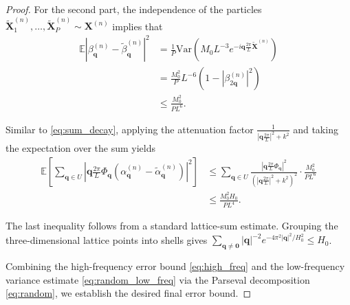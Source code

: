 \documentclass[review,onefignum,onetabnum]{siamart250211}
\begin{document}
\begin{proof}
For the second part, the independence of the particles \( \widetilde{\mathbf{X}}_1^{(n)}, \ldots, \widetilde{\mathbf{X}}_P^{(n)} \sim \mathbf{X}^{(n)} \) implies that 
\begin{equation}
\begin{aligned}
\mathbb{E}\left| \beta^{(n)}_{\mathbf{q}} - \tilde{\beta}^{(n)}_{\mathbf{q}} \right|^2 
&= \frac{1}{P} \mathrm{Var}\!\left(M_0 L^{-3}e^{-i\mathbf{q}\frac{2\pi}{L} \widetilde{\mathbf{X}}^{(n)}}\right) \\
&= \frac{M_0^2}{P}L^{-6}\left(1 - \left|\beta^{(n)}_{2\mathbf{q}}\right|^2\right) \\
&\leq \frac{M_0^2}{PL^6}.
\end{aligned}
\end{equation}

Similar to \eqref{eq:sum_decay}, applying the attenuation factor \(\frac{1}{|\mathbf{q}\frac{2\pi}{L}|^2 + k^2}\) and taking the expectation over the sum yields
\begin{equation}
\begin{aligned}
\mathbb{E}\left[\sum_{\mathbf{q} \in U} \left| \mathbf{q}\frac{2\pi}{L}\Phi_{\mathbf q}(\alpha^{(n)}_{\mathbf{q}} - \tilde{\alpha}^{(n)}_{\mathbf{q}}) \right|^2 \right]
&\leq \sum_{\mathbf{q} \in U} \frac{|\mathbf{q}\frac{2\pi}{L}\Phi_{\mathbf q}|^2}{(|\mathbf{q}\frac{2\pi}{L}|^2 + k^2)^2} \cdot \frac{M_0^2}{PL^6}\\
&\leq \frac{M_0^2 H_0}{P L^4}.
\end{aligned}
\label{eq:random_low_freq}
\end{equation}

The last inequality follows from a standard lattice-sum estimate. Grouping the three-dimensional lattice points into shells gives
\(\sum_{\mathbf q\neq\mathbf 0}|\mathbf q|^{-2}e^{-4\pi^2|\mathbf q|^2/H_0^2}\leq H_0\).

Combining the high-frequency error bound \eqref{eq:high_freq} and the low-frequency variance estimate \eqref{eq:random_low_freq} via the Parseval decomposition \eqref{eq:random}, we establish the desired final error bound.
\end{proof}
\end{document}
